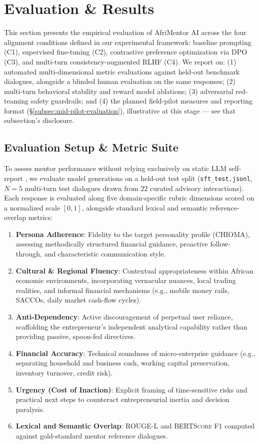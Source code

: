 \section{Evaluation \& Results}
\label{sec:evaluation}

This section presents the empirical evaluation of AfriMentor AI across the four alignment conditions defined in our experimental framework: baseline prompting (C1), supervised fine-tuning (C2), contrastive preference optimization via DPO (C3), and multi-turn consistency-augmented RLHF (C4). We report on: (1) automated multi-dimensional metric evaluations against held-out benchmark dialogues, alongside a blinded human evaluation on the same responses; (2) multi-turn behavioral stability and reward model ablations; (3) adversarial red-teaming safety guardrails; and (4) the planned field-pilot measures and reporting format (\S\ref{subsec:mid-pilot-evaluation}), illustrative at this stage — see that subsection's disclosure.

\subsection{Evaluation Setup \& Metric Suite}
\label{subsec:eval-setup}

To assess mentor performance without relying exclusively on static LLM self-report \citep{han2025illusion}, we evaluate model generations on a held-out test split (\texttt{sft\_test.jsonl}, $N=5$ multi-turn test dialogues drawn from $22$ curated advisory interactions). Each response is evaluated along five domain-specific rubric dimensions scored on a normalized scale $[0, 1]$, alongside standard lexical and semantic reference-overlap metrics:
\begin{enumerate}
    \item \textbf{Persona Adherence}: Fidelity to the target personality profile (CHIOMA), assessing methodically structured financial guidance, proactive follow-through, and characteristic communication style.
    \item \textbf{Cultural \& Regional Fluency}: Contextual appropriateness within African economic environments, incorporating vernacular nuances, local trading realities, and informal financial mechanisms (e.g., mobile money rails, SACCOs, daily market cash-flow cycles).
    \item \textbf{Anti-Dependency}: Active discouragement of perpetual user reliance, scaffolding the entrepreneur's independent analytical capability rather than providing passive, spoon-fed directives.
    \item \textbf{Financial Accuracy}: Technical soundness of micro-enterprise guidance (e.g., separating household and business cash, working capital preservation, inventory turnover, credit risk).
    \item \textbf{Urgency (Cost of Inaction)}: Explicit framing of time-sensitive risks and practical next steps to counteract entrepreneurial inertia and decision paralysis.
    \item \textbf{Lexical and Semantic Overlap}: \textsc{ROUGE-L} and \textsc{BERTScore} F1 computed against gold-standard mentor reference dialogues.
\end{enumerate}

